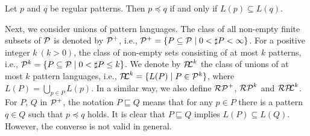 \begin{lem}\label{regularPatternEquivalence}
  Let $p$ and $q$ be regular patterns.
  Then $p \preceq q$ if and only if $L(p) \subseteq L(q)$.
\end{lem}


Next, we consider unions of pattern languages. %
The class of all non-empty finite subsets of $\mathcal{P}$ is denoted by $\mathcal{P}^{+}$, i.e.,
$\mathcal{P}^{+} = \{P \subseteq \mathcal{P} \mid 0 < \sharp P < \infty\}$.
For a positive integer $k~(k>0)$, the class of non-empty sets consisting of at most $k$ patterns, i.e.,
$\mathcal{P}^{k} = \{P \subseteq \mathcal{P} \mid 0< \sharp P \leq k\}$.
We denote by $\mathcal{P\!\!L}^{k}$ the class of unions of at most $k$ pattern languages,
i.e., $\mathcal{P\!\!L}^{k} = \{L(P) \mid P \in \mathcal{P}^{k}\}$,
where $L(P) = \bigcup_{p \in P}L(p)$.
In a similar way, we also define $\mathcal{RP}^{+}$, $\mathcal{RP}^{k}$ and $\mathcal{RP\!\!L}^{k}$.
%
For $P$, $Q$ in $\mathcal{P}^{+}$,
the notation $P \sqsubseteq Q$ means that for any $p \in P$ there is a pattern $q \in Q$ such that $p \preceq q$ holds.
It is clear that $P \sqsubseteq Q$ implies $L(P) \subseteq L(Q)$.
However, the converse is not valid in general.

